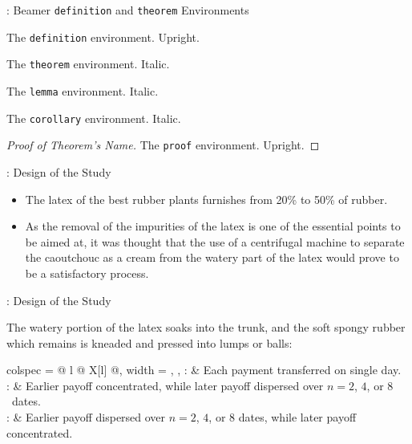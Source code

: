 \begin{frame}{\titleprefix: Beamer \texttt{definition} and \texttt{theorem} Environments}

\begin{definition}
	The \texttt{definition} environment. Upright.
\end{definition}

\begin{theorem}
	The \texttt{theorem} environment. Italic.
\end{theorem}%

\begin{lemma}
	The \texttt{lemma} environment. Italic.
\end{lemma}%

\begin{corollary}
	The \texttt{corollary} environment. Italic.
\end{corollary}%

\begin{proof}[Proof of Theorem's Name]
	The \texttt{proof} environment. Upright.
\end{proof}

\end{frame}


\begin{frame}{\titleprefix: Design of the Study}

\begin{itemize}
	\item The latex of the best rubber plants furnishes from 20\% to 50\% of rubber.
	\item As the removal of the impurities of the latex is one of the essential points to be aimed at, it was thought that the use of a centrifugal machine to separate the caoutchouc as a cream from the watery part of the latex would prove to be a satisfactory process.
\end{itemize}

\end{frame}


\begin{frame}{\titleprefix: Design of the Study}

The watery portion of the latex soaks into the trunk, and the soft spongy rubber which remains is kneaded and pressed into lumps or balls:

\begin{booktabs}{
	colspec = {@{} l @{\hspace{0.67em}} X[l] @{}},
	width = \textwidth,
}
	\alert{\balA, \balB:} &
	Each payment transferred on single day. \\
	\addlinespace
	\alert{\unbalA:} &
	Earlier payoff concentrated, while later payoff dispersed over ${n = 2}$, $4$, or $8$~dates. \\
	\addlinespace
	\alert{\unbalB:} &
	Earlier payoff dispersed over ${n = 2}$, $4$, or $8$ dates, while later payoff concentrated.
\end{booktabs}

\end{frame}


